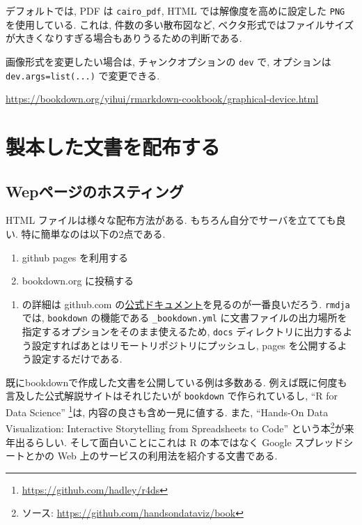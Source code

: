 \documentclass[
]{bxjsbook}
\providecommand{\tightlist}{%
  \setlength{\itemsep}{0pt}\setlength{\parskip}{0pt}}
\theoremstyle{definition}
\theoremstyle{definition}
\theoremstyle{definition}
\theoremstyle{remark}
\begin{document}
デフォルトでは, PDF は \texttt{cairo\_pdf}, HTML
では解像度を高めに設定した \texttt{PNG} を使用している. これは,
件数の多い散布図など,
ベクタ形式ではファイルサイズが大きくなりすぎる場合もありうるための判断である.

画像形式を変更したい場合は, チャンクオプションの \texttt{dev} で,
オプションは \texttt{dev.args=list(...)} で変更できる.

\url{https://bookdown.org/yihui/rmarkdown-cookbook/graphical-device.html}

\hypertarget{ux88fdux672cux3057ux305fux6587ux66f8ux3092ux914dux5e03ux3059ux308b}{%
\chapter{製本した文書を配布する}\label{ux88fdux672cux3057ux305fux6587ux66f8ux3092ux914dux5e03ux3059ux308b}}

\hypertarget{wepux30daux30fcux30b8ux306eux30dbux30b9ux30c6ux30a3ux30f3ux30b0}{%
\section{Wepページのホスティング}\label{wepux30daux30fcux30b8ux306eux30dbux30b9ux30c6ux30a3ux30f3ux30b0}}

HTML ファイルは様々な配布方法がある. もちろん自分でサーバを立てても良い.
特に簡単なのは以下の2点である.

\begin{enumerate}
\def\labelenumi{\arabic{enumi}.}
\tightlist
\item
  github pages を利用する
\item
  bookdown.org に投稿する
\end{enumerate}

\begin{enumerate}
\def\labelenumi{(\arabic{enumi})}
\tightlist
\item
  の詳細は github.com
  の\href{https://docs.github.com/ja/github/working-with-github-pages/about-github-pages}{公式ドキュメント}を見るのが一番良いだろう.
  \texttt{rmdja} では, \texttt{bookdown} の機能である
  \texttt{\_bookdown.yml}
  に文書ファイルの出力場所を指定するオプションをそのまま使えるため,
  \texttt{docs}
  ディレクトリに出力するよう設定すればあとはリモートリポジトリにプッシュし,
  pages を公開するよう設定するだけである.
\end{enumerate}

既にbookdownで作成した文書を公開している例は多数ある.
例えば既に何度も言及した公式解説サイトはそれじたいが \texttt{bookdown}
で作られているし, ``R for Data Science'' \autocite{wickham2016Data}
\footnote{\url{https://github.com/hadley/r4ds}}は,
内容の良さも含め一見に値する. また, ``Hands-On Data Visualization:
Interactive Storytelling from Spreadsheets to Code''
\autocite{doughertyforthcomingHandsOn}
という本\footnote{ソース: \url{https://github.com/handsondataviz/book}}が来年出るらしい.
そして面白いことにこれは R の本ではなく Google スプレッドシートとかの
Web 上のサービスの利用法を紹介する文書である.
\end{document}
